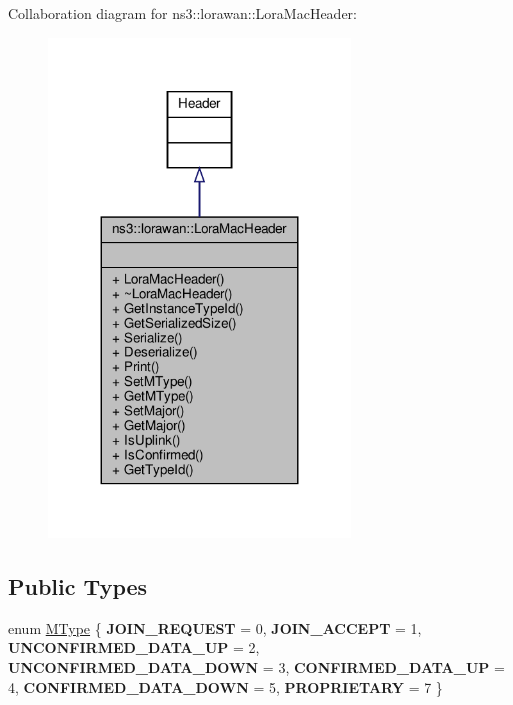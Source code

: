 Collaboration diagram for ns3\+:\+:lorawan\+:\+:Lora\+Mac\+Header\+:
\nopagebreak
\begin{figure}[H]
\begin{center}
\leavevmode
\includegraphics[width=227pt]{classns3_1_1lorawan_1_1LoraMacHeader__coll__graph}
\end{center}
\end{figure}
\subsection*{Public Types}
\begin{DoxyCompactItemize}
\item 
enum \hyperlink{classns3_1_1lorawan_1_1LoraMacHeader_afd050ac67eab24871452323799e07e94}{M\+Type} \{ \newline
{\bfseries J\+O\+I\+N\+\_\+\+R\+E\+Q\+U\+E\+ST} = 0, 
{\bfseries J\+O\+I\+N\+\_\+\+A\+C\+C\+E\+PT} = 1, 
{\bfseries U\+N\+C\+O\+N\+F\+I\+R\+M\+E\+D\+\_\+\+D\+A\+T\+A\+\_\+\+UP} = 2, 
{\bfseries U\+N\+C\+O\+N\+F\+I\+R\+M\+E\+D\+\_\+\+D\+A\+T\+A\+\_\+\+D\+O\+WN} = 3, 
\newline
{\bfseries C\+O\+N\+F\+I\+R\+M\+E\+D\+\_\+\+D\+A\+T\+A\+\_\+\+UP} = 4, 
{\bfseries C\+O\+N\+F\+I\+R\+M\+E\+D\+\_\+\+D\+A\+T\+A\+\_\+\+D\+O\+WN} = 5, 
{\bfseries P\+R\+O\+P\+R\+I\+E\+T\+A\+RY} = 7
 \}
\end{DoxyCompactItemize}
